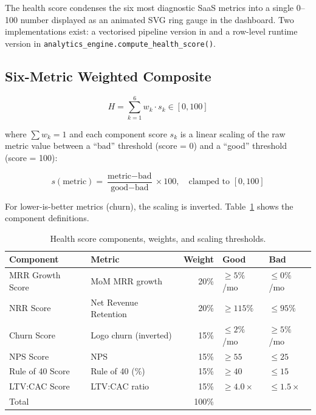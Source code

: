 
The health score condenses the six most diagnostic SaaS metrics into a single 0--100 number displayed as an animated SVG ring gauge in the dashboard. Two implementations exist: a vectorised pipeline version in  and a row-level runtime version in \texttt{analytics\_engine.compute\_health\_score()}.

\subsection{Six-Metric Weighted Composite}

\begin{equation}
  H = \sum_{k=1}^{6} w_k \cdot s_k \in [0, 100]
\end{equation}

where $\sum w_k = 1$ and each component score $s_k$ is a linear scaling of the raw metric value between a ``bad'' threshold (score = 0) and a ``good'' threshold (score = 100):

\begin{equation}
  s(\text{metric}) = \frac{\text{metric} - \text{bad}}{\text{good} - \text{bad}} \times 100, \quad \text{clamped to } [0, 100]
\end{equation}

For lower-is-better metrics (churn), the scaling is inverted. Table~\ref{tab:health-weights} shows the component definitions.

\begin{table}[h]
\centering
\caption{Health score components, weights, and scaling thresholds.}
\begin{tabular}{llrll}
\toprule
\textbf{Component} & \textbf{Metric} & \textbf{Weight} & \textbf{Good} & \textbf{Bad} \\
\midrule
MRR Growth Score & MoM MRR growth        & 20\% & $\geq 5\%$/mo    & $\leq 0\%$/mo \\
NRR Score        & Net Revenue Retention & 20\% & $\geq 115\%$     & $\leq 95\%$ \\
Churn Score      & Logo churn (inverted) & 15\% & $\leq 2\%$/mo    & $\geq 5\%$/mo \\
NPS Score        & NPS                   & 15\% & $\geq 55$        & $\leq 25$ \\
Rule of 40 Score & Rule of 40 (\%)       & 15\% & $\geq 40$        & $\leq 15$ \\
LTV:CAC Score    & LTV:CAC ratio         & 15\% & $\geq 4.0\times$ & $\leq 1.5\times$ \\
\midrule
\multicolumn{2}{l}{Total}               & 100\% & & \\
\bottomrule
\end{tabular}
\label{tab:health-weights}
\end{table}

